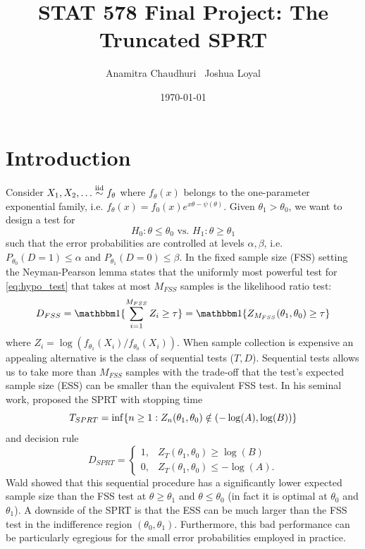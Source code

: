 \documentclass[11pt]{article}
\begin{document}
\title{  {\LARGE STAT 578 Final Project: The Truncated SPRT} }

\author{
    Anamitra Chaudhuri \,
    Joshua Loyal
}

\date{\today}
\maketitle

\section{Introduction}
Consider $X_1, X_2, \dots \overset{\text{iid}}\sim f_{\theta}$ where $f_{\theta}(x)$ belongs to the one-parameter exponential family, i.e. $f_{\theta}(x) = f_0(x)e^{x\theta - \psi(\theta)}$. Given $\theta_1 > \theta_0$, we want to design a test for
\begin{equation}\label{eq:hypo_test}
H_0: \theta \leq \theta_0 \text{ vs. } H_1: \theta \geq \theta_1
\end{equation}
such that the error probabilities are controlled at levels $\alpha, \beta$, i.e. $P_{\theta_0}(D = 1) \leq \alpha$ and $P_{\theta_1}(D = 0) \leq \beta$. In the fixed sample size (FSS) setting the Neyman-Pearson lemma states that the uniformly most powerful test for \ref{eq:hypo_test} that takes at most $M_{FSS}$ samples is the likelihood ratio test:
\begin{equation}
D_{FSS} = \ind{\sum_{i=1}^{M_{FSS}} Z_i \geq \tau}  = \ind{Z_{M_{FSS}}(\theta_1, \theta_0) \geq \tau}
\end{equation}
where $Z_i = \log(f_{\theta_1}(X_i) / f_{\theta_0}(X_i))$. When sample collection is expensive an appealing alternative is the class of sequential tests ($T, D$). Sequential tests allows us to take more than $M_{FSS}$ samples with the trade-off that the test's expected sample size (ESS) can be smaller than the equivalent FSS test. In his seminal work, \citet{wald1947} proposed the SPRT with stopping time
\begin{equation}
T_{SPRT} = \inf\{n \geq 1 : Z_n(\theta_1, \theta_0) \notin (-\log(A), \log(B))\}
\end{equation}
and decision rule
\begin{equation}
D_{SPRT} =
\begin{cases}
1, & Z_T(\theta_1, \theta_0) \geq \log(B) \\
0, & Z_T(\theta_1, \theta_0) \leq -\log(A).
\end{cases}
\end{equation}
Wald showed that this sequential procedure has a significantly lower expected sample size than the FSS test at $\theta \geq \theta_1$ and $\theta \leq \theta_0$ (in fact it is optimal at $\theta_0$ and $\theta_1$). A downside of the SPRT is that the ESS can be much larger than the FSS test in the indifference region $(\theta_0, \theta_1)$. Furthermore, this bad performance can be particularly egregious for the small error probabilities employed in practice.
\end{document}
